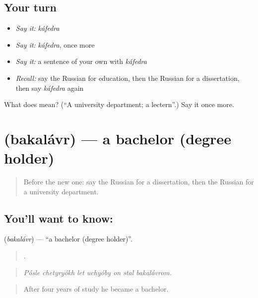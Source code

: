\subsection*{Your turn}
\begin{itemize}
\raggedright
  \item \emph{Say it:} \emph{káfedra}
  \item \emph{Say it:} \emph{káfedra}, once more
  \item \emph{Say it:} a sentence of your own with \emph{káfedra}
  \item \emph{Recall:} say the Russian for education, then the Russian for a dissertation, then say \emph{káfedra} again
\end{itemize}

\begin{tcolorbox}[breakable,colback=teal!4,colframe=teal!35!black,title={Before you move on}]
What does  mean? (\textquotedblleft{}A university department; a lectern\textquotedblright{}.) Say it once more.
\end{tcolorbox}
\section[\texorpdfstring{\ru{бакалавр} (bakalávr)}{бакалавр (bakalávr)}]{ (bakalávr) — a bachelor (degree holder)}

\label{lesson:RU-C385-bakalavr}



\begin{quote}
Before the new one: say the Russian for a dissertation, then the Russian for a university department.
\end{quote}

\subsection*{You'll want to know: }
\textbf{} (\emph{bakalávr}) — \textquotedblleft{}a bachelor (degree holder)\textquotedblright{}.

\begin{quote}
      .
\end{quote}

\begin{quote}
\emph{Pósle chetyryókh let uchyóby on stal bakalávrom.}
\end{quote}

\begin{quote}
After four years of study he became a bachelor.
\end{quote}

